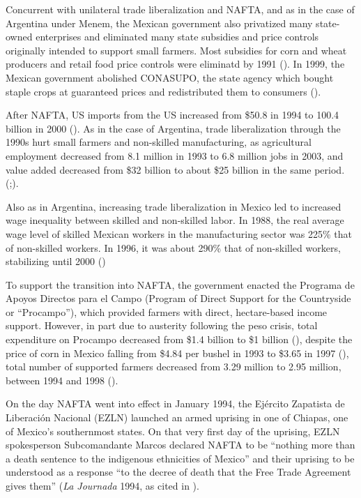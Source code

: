 \documentclass[12pt]{report}
\begin{document}
Concurrent with unilateral trade liberalization and NAFTA, and as
in the case of Argentina under Menem, the Mexican government also
privatized many state-owned enterprises and eliminated many state
subsidies and price controls originally intended to support small
farmers. Most subsidies for corn and wheat producers and retail food
price controls were eliminatd by 1991 (\citealt[295]{Hufbauer:2005vh}).
In 1999, the Mexican government abolished CONASUPO, the state agency
which bought staple crops at guaranteed prices and redistributed them
to consumers (\citealt[12]{Villareal:2010vk}).

After NAFTA, US imports from the US increased from \$50.8 in 1994
to 100.4 billion in 2000 (\citealt[10]{Villareal:2010vk}). As in
the case of Argentina, trade liberalization through the 1990s hurt
small farmers and non-skilled manufacturing, as agricultural employment
decreased from 8.1 million in 1993 to 6.8 million jobs in 2003, and
value added decreased from \$32 billion to about \$25 billion in the
same period. (\citealt[289]{Hufbauer:2005vh};\citealt[14]{Villareal:2010vk}).

Also as in Argentina, increasing trade liberalization in Mexico led
to increased wage inequality between skilled and non-skilled labor.
In 1988, the real average wage level of skilled Mexican workers in
the manufacturing sector was 225\% that of non-skilled workers. In
1996, it was about 290\% that of non-skilled workers, stabilizing
until 2000 (\citealt[9]{Villareal:2010vk}) 

To support the transition into NAFTA, the government enacted the Programa
de Apoyos Directos para el Campo (Program of Direct Support for the
Countryside or ``Procampo''), which provided farmers with direct,
hectare-based income support. However, in part due to austerity following
the peso crisis, total expenditure on Procampo decreased from \$1.4
billion to \$1 billion (\citealt[295]{Hufbauer:2005vh}), despite
the price of corn in Mexico falling from \$4.84 per bushel in 1993
to \$3.65 in 1997 (\citealt[12]{Villareal:2010vk}), total number
of supported farmers decreased from 3.29 million to 2.95 million,
between 1994 and 1998 (\citealt[295]{Hufbauer:2005vh}).

On the day NAFTA went into effect in January 1994, the Ejército Zapatista
de Liberación Nacional (EZLN) launched an armed uprising in one of
Chiapas, one of Mexico's southernmost states. On that very first day
of the uprising, EZLN spokesperson Subcomandante Marcos declared NAFTA
to be ``nothing more than a death sentence to the indigenous ethnicities
of Mexico'' and their uprising to be understood as a response ``to
the decree of death that the Free Trade Agreement gives them'' (\emph{La
Journada }1994, as cited in \citealt[216]{Hayden:2009uy}).
\end{document}
